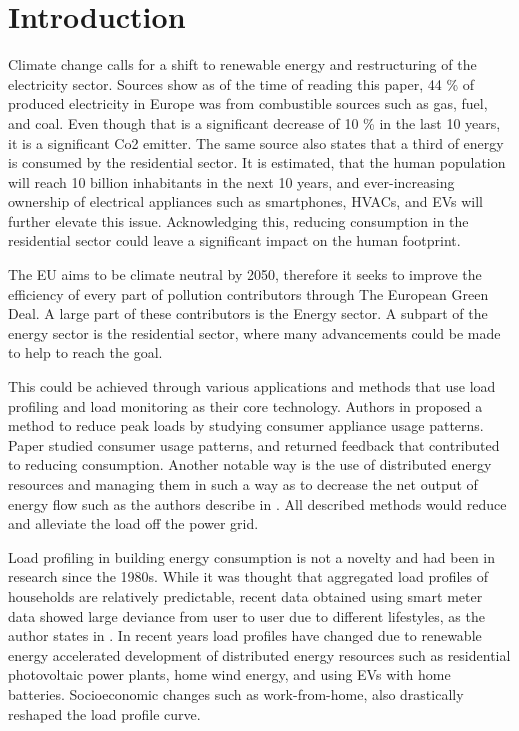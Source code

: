 \chapter{Introduction}
\label{chapter1}

Climate change calls for a shift to renewable energy and restructuring of the electricity sector.
Sources \cite{eurostat2020} show as of the time of reading this paper, 44 \% of produced electricity in Europe was from combustible sources such as gas, fuel, and coal. Even 
though that is a significant decrease of 10 \% in the last 10 years, it is a significant Co2 emitter.
The same source \cite{eurostat2020} also states that a third of energy is consumed by the residential sector. It is estimated, 
that the human population will reach 10 billion inhabitants in the next 10 years, and ever-increasing ownership of electrical appliances such as smartphones, HVACs, and EVs will further elevate this issue.
Acknowledging this, reducing consumption in the residential sector could leave a significant impact on the human footprint. 


The EU aims to be climate neutral by 2050, therefore it seeks to improve the efficiency of every part of pollution contributors through The European Green Deal.
A large part of these contributors is the Energy sector.
A subpart of the energy sector is the residential sector, where many advancements could be made to help to reach the goal.  

This could be achieved through various applications and methods that use load profiling and load monitoring as their core technology.
Authors in \cite{Chuan2014} proposed a method to reduce peak loads by studying consumer
appliance usage patterns. Paper \cite{Csoknyai2019} studied consumer usage patterns, and returned feedback that contributed to reducing consumption.
Another notable way is the use of distributed energy resources and managing them in such a way as to decrease the net output of energy flow such as the authors describe in
\cite{MORENOJARAMILLO2021445}. All described methods would reduce and alleviate the load off the power grid.


Load profiling in building energy consumption is not a novelty and had been in research since the 1980s.
While it was thought that aggregated load profiles of households are relatively predictable, recent data obtained using smart meter data showed large deviance from user to user due to different lifestyles, as the author states in \cite{Review2021}.
In recent years load profiles have changed due to renewable energy accelerated development of distributed energy resources such as residential photovoltaic
power plants, home wind energy, and using EVs with home batteries. Socioeconomic changes such as work-from-home, also drastically reshaped the load profile curve. 

